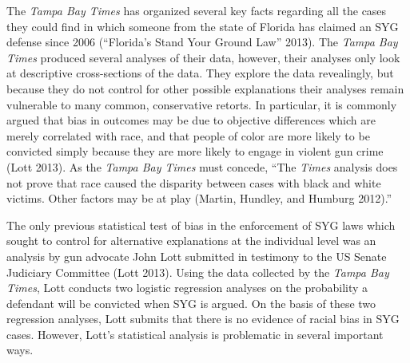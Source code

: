 \documentclass[12pt,article]{article}
\begin{document}
The \emph{Tampa Bay Times} has organized several key facts regarding all
the cases they could find in which someone from the state of Florida has
claimed an SYG defense since 2006 (``Florida's Stand Your Ground Law''
2013). The \emph{Tampa Bay Times} produced several analyses of their
data, however, their analyses only look at descriptive cross-sections of
the data. They explore the data revealingly, but because they do not
control for other possible explanations their analyses remain vulnerable
to many common, conservative retorts. In particular, it is commonly
argued that bias in outcomes may be due to objective differences which
are merely correlated with race, and that people of color are more
likely to be convicted simply because they are more likely to engage in
violent gun crime (Lott 2013). As the \emph{Tampa Bay Times} must
concede, ``The \emph{Times} analysis does not prove that race caused the
disparity between cases with black and white victims. Other factors may
be at play (Martin, Hundley, and Humburg 2012).''

The only previous statistical test of bias in the enforcement of SYG
laws which sought to control for alternative explanations at the
individual level was an analysis by gun advocate John Lott submitted in
testimony to the US Senate Judiciary Committee (Lott 2013). Using the
data collected by the \emph{Tampa Bay Times}, Lott conducts two logistic
regression analyses on the probability a defendant will be convicted
when SYG is argued. On the basis of these two regression analyses, Lott
submits that there is no evidence of racial bias in SYG cases. However,
Lott's statistical analysis is problematic in several important ways.
\end{document}
